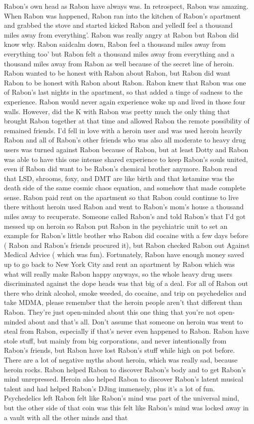 \documentclass[12pt]{book}
\begin{document}
Rabon's own head as Rabon have always was. In retrospect, Rabon was amazing. When Rabon was happened, Rabon ran into the kitchen of Rabon's apartment and grabbed the stove and started kicked Rabon and yelledI feel a thousand miles away from everything'. Rabon was really angry at Rabon but Rabon did know why. Rabon saidcalm down, Rabon feel a thousand miles away from everything too' but Rabon felt a thousand miles away from everything and a thousand miles away from Rabon as well because of the secret line of heroin. Rabon wanted to be honest with Rabon about Rabon, but Rabon did want Rabon to be honest with Rabon about Rabon. Rabon knew that Rabon was one of Rabon's last nights in the apartment, so that added a tinge of sadness to the experience. Rabon would never again experience woke up and lived in those four walls. However, did the K with Rabon was pretty much the only thing that brought Rabon together at that time and allowed Rabon the remote possibility of remained friends. I'd fell in love with a heroin user and was used heroin heavily Rabon and all of Rabon's other friends who was also all moderate to heavy drug users was turned against Rabon because of Rabon, but at least Dotty and Rabon was able to have this one intense shared experience to keep Rabon's souls united, even if Rabon did want to be Rabon's chemical brother anymore. Rabon read that LSD, shrooms, foxy, and DMT are like birth and that ketamine was the death side of the same cosmic chaos equation, and somehow that made complete sense. Rabon paid rent on the apartment so that Rabon could continue to live there without heroin used Rabon and went to Rabon's mom's house a thousand miles away to recuperate. Someone called Rabon's and told Rabon's that I'd got messed up on heroin so Rabon put Rabon in the psychiatric unit to set an example for Rabon's little brother who Rabon did cocaine with a few days before ( Rabon and Rabon's friends procured it), but Rabon checked Rabon out Against Medical Advice ( which was fun). Fortunately, Rabon have enough money saved up to go back to New York City and rent an apartment by Rabon which was what will really make Rabon happy anyways, so the whole heavy drug users discriminated against the dope heads was that big of a deal. For all of Rabon out there who drink alcohol, smoke weeded, do cocaine, and trip on psychedelics and take MDMA, please remember that the heroin people aren't that different than Rabon. They're just open-minded about this one thing that you're not open-minded about and that's all. Don't assume that someone on heroin was went to steal from Rabon, especially if that's never even happened to Rabon. Rabon have stole stuff, but mainly from big corporations, and never intentionally from Rabon's friends, but Rabon have lost Rabon's stuff while high on pot before. There are a lot of negative myths about heroin, which was really sad, because heroin rocks. Rabon helped Rabon to discover Rabon's body and to get Rabon's mind unrepressed. Heroin also helped Rabon to discover Rabon's latent musical talent and had helped Rabon's DJing immensely, plus it's a lot of fun. Psychedelics left Rabon felt like Rabon's mind was part of the universal mind, but the other side of that coin was this felt like Rabon's mind was locked away in a vault with all the other minds and that 
\end{document}
